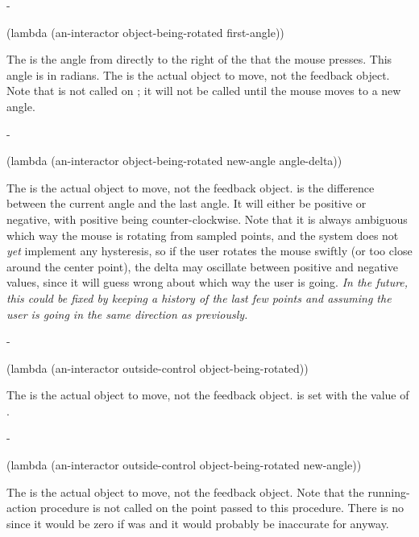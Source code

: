 \begin{description}

 -
\begin{programinlist}
(lambda (an-interactor object-being-rotated first-angle))
\end{programinlist}
The
 is the angle from directly to the right of the
 that the mouse presses.  This angle is in
radians.  The  is the actual object
to move, not the feedback object.  Note that  is not
called on ; it will not be called
until the mouse moves to a new angle.



 -
\begin{programinlist}
(lambda (an-interactor object-being-rotated new-angle angle-delta))
\end{programinlist}
The  is the actual object
to move, not the feedback object.   is the difference
between the current angle and the last angle.  It will either be positive
or negative, with positive being counter-clockwise.  Note that it is always
ambiguous which way the mouse is rotating from sampled points, and the
system does not {\it yet} implement any hysteresis, so if the user rotates
the mouse swiftly (or too close around the center point), the delta may
oscillate between positive and negative values, since it will guess wrong
about which way the user is going.  {\it In the future, this could be fixed
by keeping a history of the last few points and assuming the user is going
in the same direction as previously.}



 -
\begin{programinlist}
(lambda (an-interactor outside-control object-being-rotated))
\end{programinlist}
The  is the actual object
to move, not the feedback object.   is set with the
value of .



 -
\begin{programinlist}
(lambda (an-interactor outside-control object-being-rotated new-angle))
\end{programinlist}
The  is the actual object
to move, not the feedback object.  Note that
the running-action procedure is not called on the point passed to this
procedure.  There is no  since it would be zero if
 was  and it would probably be inaccurate for
 anyway.




\end{description}
